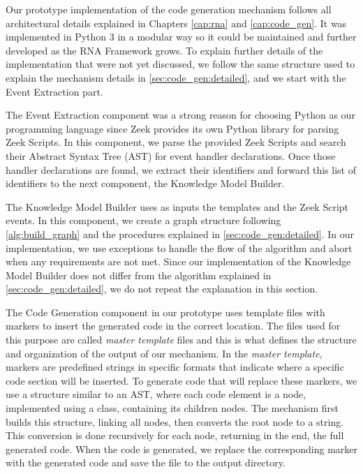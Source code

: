 Our prototype implementation of the code generation mechanism follows all architectural details explained in Chapters \ref{cap:rna} and \ref{cap:code_gen}. It was implemented in Python 3 in a modular way so it could be maintained and further developed as the RNA Framework grows. To explain further details of the implementation that were not yet discussed, we follow the same structure used to explain the mechanism details in \autoref{sec:code_gen:detailed}, and we start with the Event Extraction part.

The Event Extraction component was a strong reason for choosing Python as our programming language since Zeek provides its own Python library for parsing Zeek Scripts. In this component, we parse the provided Zeek Scripts and search their Abstract Syntax Tree (AST) for event handler declarations. Once those handler declarations are found, we extract their identifiers and forward this list of identifiers to the next component, the Knowledge Model Builder.

The Knowledge Model Builder uses as inputs the templates and the Zeek Script events. In this component, we create a graph structure following \autoref{alg:build_graph} and the procedures explained in \autoref{sec:code_gen:detailed}. In our implementation, we use exceptions to handle the flow of the algorithm and abort when any requirements are not met. Since our implementation of the Knowledge Model Builder does not differ from the algorithm explained in \autoref{sec:code_gen:detailed}, we do not repeat the explanation in this section.

The Code Generation component in our prototype uses template files with markers to insert the generated code in the correct location. The files used for this purpose are called \textit{master template} files and this is what defines the structure and organization of the output of our mechanism. In the \textit{master template}, markers are predefined strings in specific formats that indicate where a specific code section will be inserted. To generate code that will replace these markers, we use a structure similar to an AST, where each code element is a node, implemented using a class, containing its children nodes. The mechanism first builds this structure, linking all nodes, then converts the root node to a string. This conversion is done recursively for each node, returning in the end, the full generated code. When the code is generated, we replace the corresponding marker with the generated code and save the file to the output directory.

